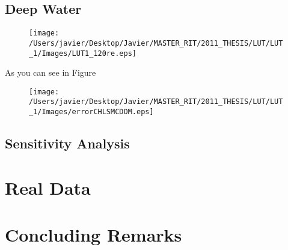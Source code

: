 \subsection{Deep Water}

  \begin{figure}[H]
	\centering
    	\texttt{[image: /Users/javier/Desktop/Javier/MASTER\_RIT/2011\_THESIS/LUT/LUT\_1/Images/LUT1\_120re.eps]}
  \end{figure}

As you can see in Figure %

  \begin{figure}[H]
	\centering
    	\texttt{[image: /Users/javier/Desktop/Javier/MASTER\_RIT/2011\_THESIS/LUT/LUT\_1/Images/errorCHLSMCDOM.eps]}
  \end{figure}


\subsection{Sensitivity Analysis}

\section{Real Data}

\section{Concluding Remarks}